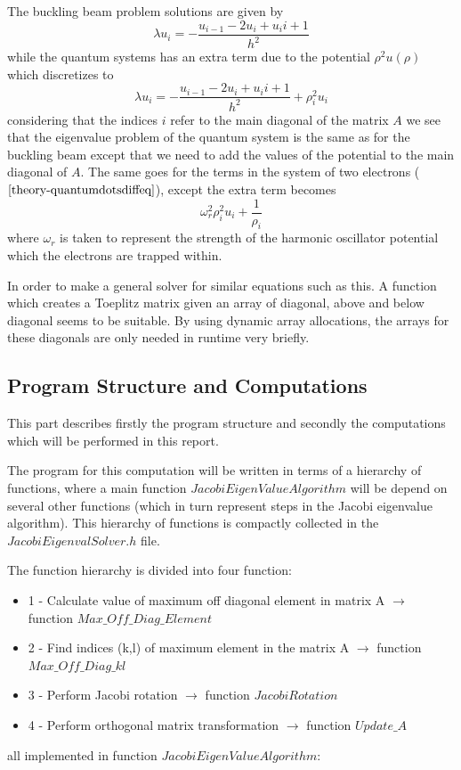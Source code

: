 \documentclass[aip,nobalancelastpage,
twocolumn,
rsi,%
 amsmath,amssymb,
 reprint,%
]{revtex4}
\begin{document}
The buckling beam problem solutions are given by
\begin{equation}
\lambda u_i = -\frac{u_{i-1} -2u_i + u_i{i+1}}{h^2}
\end{equation}
while the quantum systems has an extra term due to the potential $\rho^2u(\rho)$ which discretizes to
\begin{equation}
\lambda u_i = -\frac{u_{i-1} -2u_i + u_i{i+1}}{h^2} + \rho_i^2 u_i
\end{equation}
considering that the indices $i$ refer to the main diagonal of the matrix $A$ we see that the eigenvalue problem of the quantum system is the same as for the buckling beam except that we need to add the values of the potential to the main diagonal of $A$. The same goes for the terms in the system of two electrons ($\ref{theory-quantumdotsdiffeq}$), except the extra term becomes
\begin{equation}
\omega_r^2 \rho_i^2 u_i + \frac{1}{\rho_i}
\end{equation}
where $\omega_r$ is taken to represent the strength of the harmonic oscillator potential which the electrons are trapped within.\par
In order to make a general solver for similar equations such as this. A function which creates a Toeplitz matrix given an array of diagonal, above and below diagonal seems to be suitable. By using dynamic array allocations, the arrays for these diagonals are only needed in runtime very briefly.\par


\subsection{Program Structure and Computations}
This part describes firstly the program structure and secondly the computations which will be performed in this report.\par
The program for this computation will be written in terms of a hierarchy of functions, where a main function $JacobiEigenValueAlgorithm$ will be depend on several other functions (which in turn represent steps in the Jacobi eigenvalue algorithm). This hierarchy of functions is compactly collected in the $JacobiEigenvalSolver.h$ file.\par
The function hierarchy is divided into four function: 
\begin{itemize}
\item 1 - Calculate value of maximum off diagonal element in matrix A $\rightarrow$ function $Max\_Off\_Diag\_Element$
\item 2 - Find indices (k,l) of maximum element in the matrix A $\rightarrow$ function $Max\_Off\_Diag\_kl$
\item 3 - Perform Jacobi rotation $\rightarrow$ function $JacobiRotation$
\item 4 - Perform orthogonal matrix transformation $\rightarrow$ function $Update\_A$
\end{itemize}
all implemented in function $JacobiEigenValueAlgorithm$:
\end{document}

